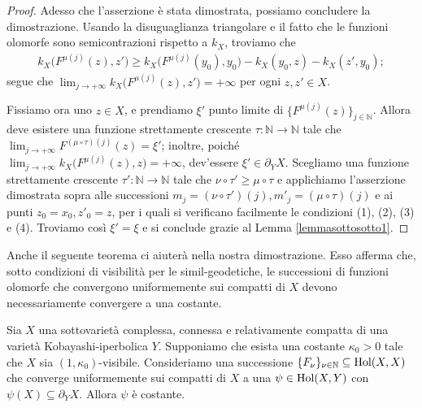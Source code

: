 \begin{proof}
    Adesso che l'asserzione è stata dimostrata, possiamo concludere la dimostrazione. Usando la disuguaglianza triangolare e il fatto che le funzioni olomorfe sono semicontrazioni rispetto a $k_X$, troviamo che
    \begin{gather*}
        k_X\big(F^{\mu(j)}(z),z'\big) \ge k_X\big(F^{\mu(j)}(y_0),y_0\big)-k_X(y_0,z)-k_X(z',y_0);
    \end{gather*}
    segue che $\displaystyle\lim_{j\longrightarrow+\infty}k_X\big(F^{\mu(j)}(z),z'\big)=+\infty$ per ogni $z,z' \in X$.

     Fissiamo ora uno $z\in X$, e prendiamo $\xi'$ punto limite di $\{F^{\mu(j)}(z)\}_{j\in\mathbb{N}}$. Allora deve esistere una funzione strettamente crescente $\tau:\mathbb{N}\longrightarrow\mathbb{N}$ tale che $\displaystyle \lim_{j\longrightarrow+\infty} F^{(\mu\circ\tau)(j)}(z)=\xi'$; inoltre, poiché $\displaystyle\lim_{j\longrightarrow+\infty}k_X\big(F^{\mu(j)}(z),z\big)=+\infty$, dev'essere $\xi'\in\partial_YX$. Scegliamo una funzione strettamente crescente $\tau':\mathbb{N}\longrightarrow\mathbb{N}$ tale che $\nu\circ\tau' \ge \mu\circ\tau$ e applichiamo l'asserzione dimostrata sopra alle successioni $m_j=(\nu\circ\tau')(j), m'_j=(\mu\circ\tau)(j)$ e ai punti $z_0=x_0,z'_0=z$, per i quali si verificano facilmente le condizioni (1), (2), (3) e (4). Troviamo così $\xi'=\xi$ e si conclude grazie al Lemma \ref{lemmasottosotto1}.
\end{proof}

Anche il seguente teorema ci aiuterà nella nostra dimostrazione. Esso afferma che, sotto condizioni di visibilità per le simil-geodetiche, le successioni di funzioni olomorfe che convergono uniformemente sui compatti di $X$ devono necessariamente convergere a una costante.

\begin{thm} \label{lim_is_const}
    Sia $X$ una sottovarietà complessa, connessa e relativamente compatta di una varietà Kobayashi-iperbolica $Y$. Supponiamo che esista una costante $\kappa_0>0$ tale che $X$ sia $(1,\kappa_0)$-visibile. Consideriamo una successione $\{F_\nu\}_{\nu\in\mathbb{N}} \subseteq \textnormal{Hol}(X,X)$ che converge uniformemente sui compatti di $X$ a una $\psi\in\textnormal{Hol}(X,Y)$ con $\psi(X)\subseteq\partial_YX$. Allora $\psi$ è costante.
\end{thm}

